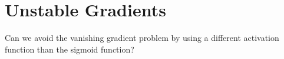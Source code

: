 \chapter{Unstable Gradients}

\begin{exercise}
Can we avoid the vanishing gradient problem by using a different activation function 
than the sigmoid function?
\end{exercise}

